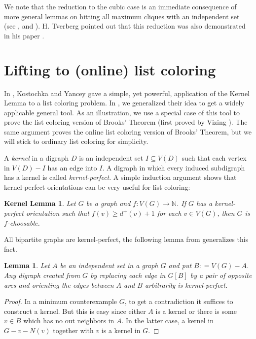 \documentclass[12pt]{amsart}
\theoremstyle{plain}
\newtheorem*{KernelLemma}{Kernel Lemma}
\newtheorem{lem}[thm]{Lemma}
\theoremstyle{definition}
\theoremstyle{remark}
\newcommand{\IN}{\mathbb{N}}
\newcommand{\func}[3]{#1\colon #2 \rightarrow #3}
\newcommand{\DefinedAs}{\mathrel{\mathop:}=}
\begin{document}
We note that the reduction to the cubic case is an immediate consequence of more
general lemmas on hitting all maximum cliques with an independent set
(see \cite{kostochkaRussian}, \cite{rabernhitting} and \cite{KingHitting}).  H.
Tverberg pointed out that this reduction was also demonstrated in his paper
\cite{tverberg1983brooks}.

\section*{Lifting to (online) list coloring}

In \cite{kostochkayancey2012ore}, Kostochka and Yancey gave a simple, yet powerful, application of the Kernel Lemma to a list coloring problem.  In \cite{orevizing}, we generalized
their idea to get a widely applicable general tool.  As an illustration, we use a special case of this tool to prove the list coloring version of Brooks' Theorem (first proved by Vizing \cite{vizing1976}).
The same argument proves the online list coloring version of Brooks' Theorem, but we will stick to ordinary list coloring for simplicity.

A \emph{kernel} in a digraph $D$ is an independent set $I \subseteq V(D)$ such that each vertex in $V(D) - I$ has an edge into $I$.  A digraph in which every induced subdigraph has a kernel is called \emph{kernel-perfect}.
A simple induction argument shows that kernel-perfect orientations can be very useful for list coloring:

\begin{KernelLemma}
Let $G$ be a graph and $\func{f}{V(G)}{\IN}$. If $G$ has a kernel-perfect orientation such that $f(v) \geq d^+(v) + 1$ for each $v \in V(G)$, then $G$ is $f$-choosable.
\end{KernelLemma}

All bipartite graphs are kernel-perfect, the following lemma from \cite{kostochkayancey2012ore} generalizes this fact.

\begin{lem}\label{KernelPerfect}
Let $A$ be an independent set in a graph $G$ and put $B \DefinedAs V(G) - A$.  Any digraph created from $G$ by replacing each edge in $G[B]$ by a pair of opposite arcs and orienting the edges between $A$ and $B$ arbitrarily is kernel-perfect.
\end{lem}
\begin{proof}
In a minimum counterexample $G$, to get a contradiction it suffices to construct a kernel.  But this is easy since either $A$ is a kernel or there is some $v \in B$ which has no out neighbors in $A$.  In the latter case, a kernel in $G - v - N(v)$ together with $v$ is a kernel in $G$.
\end{proof}
\end{document}
